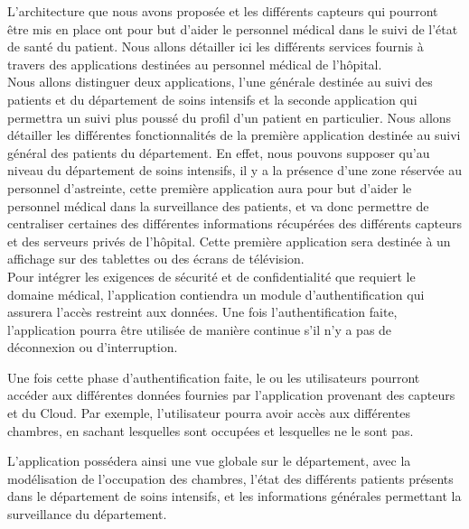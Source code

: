 L’architecture que nous avons proposée et les différents capteurs qui pourront être mis en place ont pour but d’aider le personnel médical dans le suivi de l’état de santé du patient. Nous allons détailler ici les différents services fournis à travers des applications destinées au personnel médical de l’hôpital.
\\

Nous allons distinguer deux applications, l’une générale destinée au suivi des patients et du département de soins intensifs et la seconde application qui permettra un suivi plus poussé du profil d’un patient en particulier. Nous allons détailler les différentes fonctionnalités de la première application destinée au suivi général des patients du département. En effet, nous pouvons supposer qu’au niveau du département de soins intensifs, il y a la présence d’une zone réservée au personnel d’astreinte, cette première application aura pour but d’aider le personnel médical dans la surveillance des patients, et va donc permettre de centraliser certaines des différentes informations récupérées des différents capteurs et des serveurs privés de l’hôpital. Cette première application sera destinée à un affichage sur des tablettes ou des écrans de télévision. 
\\

Pour intégrer les exigences de sécurité et de confidentialité que requiert le domaine médical, l’application contiendra un module
d’authentification qui assurera l’accès restreint aux données. Une fois l’authentification faite, l’application pourra être
utilisée de manière continue s’il n’y a pas de déconnexion ou d’interruption.


Une fois cette phase d’authentification faite, le ou les utilisateurs pourront accéder aux différentes données fournies par l’application provenant des capteurs et du Cloud. Par exemple, l’utilisateur pourra avoir accès aux différentes chambres, en sachant lesquelles sont occupées et lesquelles ne le sont pas.


L’application possédera ainsi une vue globale sur le département, avec la modélisation de l’occupation des chambres, l’état des différents patients présents dans le département de soins intensifs, et les informations générales permettant la surveillance du département.

